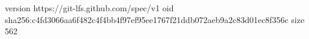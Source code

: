 version https://git-lfs.github.com/spec/v1
oid sha256:c4fd3066aa6f482c4f4bb4f97ef95ee1767f21ddb072aeb9a2c83d01ec8f356c
size 562
